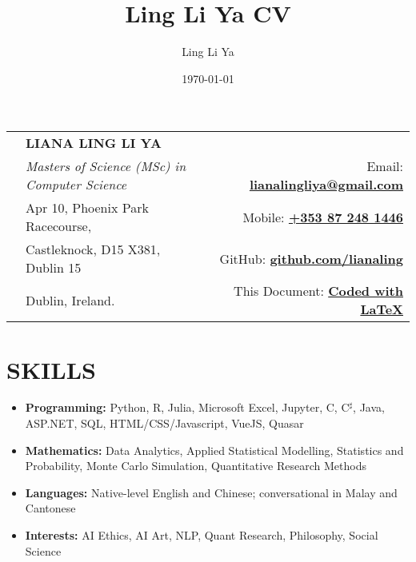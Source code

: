 \documentclass[a4paper,11pt]{article}
\title{Ling Li Ya CV}
\author{Ling Li Ya}
\date{\today}
\newcommand{\resumeItem}[2]{
  \item\small{
    {#1}{#2 \vspace{-2pt}}
  }
}
\newcommand{\resumeSubItem}[2]{\resumeItem{#1}{#2}\vspace{-4pt}}
\newcommand{\resumeSubHeadingListStart}{\begin{itemize}[leftmargin=*]}
\newcommand{\resumeSubHeadingListEnd}{\end{itemize}}
\newcommand{\CC}{C\nolinebreak\hspace{-.05em}\raisebox{.4ex}{\tiny\bf +}\nolinebreak\hspace{-.10em}\raisebox{.4ex}{\tiny\bf +}}
\def\CC{{C\nolinebreak[4]\hspace{-.05em}\raisebox{.4ex}{\tiny\bf ++}}}
\newcommand{\mytextsharp}{$^\sharp$}
\begin{document}
\begin{tabular*}{\textwidth\footnotesize}{ll @{\extracolsep{\fill}}r}
  \multirow{5}{*}{
    \begin{minipage}[l][2.0cm][c]{2.25cm}
    \end{minipage}}  & {\textbf{\Large LIANA LING LI YA}} & \\
  & {\textit{Masters of Science (MSc) in Computer Science}} & {Email: \textbf{\href{mailto:lianalingliya@gmail.com}{lianalingliya@gmail.com}}} \\
  & {Apr 10, Phoenix Park Racecourse}, & {Mobile: \textbf{\href{tel:+60172801215}{+353 87 248 1446}}} \\
  & {Castleknock, D15 X381, Dublin 15} & {GitHub: \textbf{\href{http://github.com/lianaling/}{github.com/lianaling}}}\\
  & {Dublin, Ireland.} & {This Document: \textbf{\href{https://github.com/lianaling/resume/}{Coded with \LaTeX}}} \\
\end{tabular*}

\section{SKILLS}
\resumeSubHeadingListStart
\resumeSubItem{\textbf{Programming: }}{Python, R, Julia, Microsoft Excel, Jupyter, \CC, C\mytextsharp, Java, ASP.NET, SQL, HTML/CSS/Javascript, VueJS, Quasar}
\resumeSubItem{\textbf{Mathematics: }}{Data Analytics, Applied Statistical Modelling, Statistics and Probability, Monte Carlo Simulation, Quantitative Research Methods}
\resumeSubItem{\textbf{Languages: }}{Native-level English and Chinese; conversational in Malay and Cantonese}
\resumeSubItem{\textbf{Interests: }}{AI Ethics, AI Art, NLP, Quant Research, Philosophy, Social Science}
\resumeSubHeadingListEnd

\end{document}
